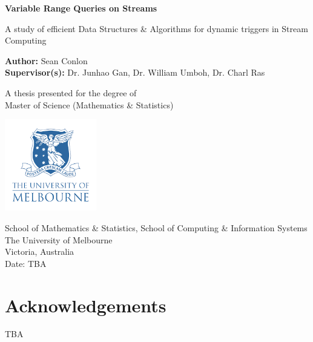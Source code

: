 \documentclass{article}
\begin{document}
\begin{titlepage}
   \begin{center}
       \vspace*{1cm}

       \textbf{Variable Range Queries on Streams}

       \vspace{0.5cm}
        A study of efficient Data Structures \& Algorithms for dynamic triggers in Stream Computing
            
       \vspace{1.5cm}

       \textbf{Author:} Sean Conlon \\
       \textbf{Supervisor(s):} Dr. Junhao Gan, Dr. William Umboh, Dr. Charl Ras

       \vfill
            
       A thesis presented for the degree of\\
       Master of Science (Mathematics \& Statistics) 
            
       \vspace{0.8cm}
     
       \includegraphics[width=0.3\textwidth]{images/uomlogo.png}
            
       School of Mathematics \& Statistics, School of Computing \& Information Systems\\
       The University of Melbourne\\
       Victoria, Australia\\
       Date: TBA
            
   \end{center}
\end{titlepage}



\newpage
\section*{Acknowledgements}
TBA



\newpage
\tableofcontents
\thispagestyle{empty}
\clearpage
\setcounter{page}{1}




\newpage
 


\newpage




\newpage




\newpage

\end{document}
